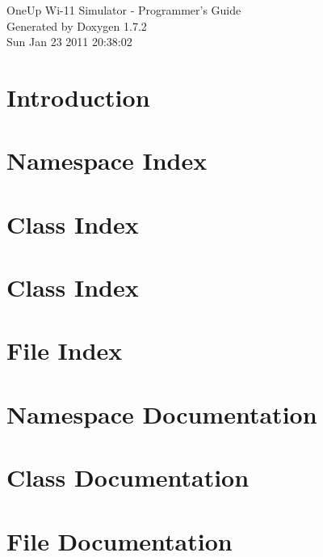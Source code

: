 \documentclass[letterpaper]{book}
\begin{document}
\hypersetup{pageanchor=false}
\begin{titlepage}
\vspace*{7cm}
\begin{center}
{\Large OneUp Wi-\/11 Simulator -\/ Programmer's Guide }\\
\vspace*{1cm}
{\large Generated by Doxygen 1.7.2}\\
\vspace*{0.5cm}
{\small Sun Jan 23 2011 20:38:02}\\
\end{center}
\end{titlepage}
\clearemptydoublepage
{}
\tableofcontents
\clearemptydoublepage
{}
\hypersetup{pageanchor=true}
\chapter{Introduction}
\label{index}\hypertarget{index}{}
\chapter{Namespace Index}

\chapter{Class Index}

\chapter{Class Index}

\chapter{File Index}

\chapter{Namespace Documentation}


\chapter{Class Documentation}


















\chapter{File Documentation}
















\printindex
\end{document}
